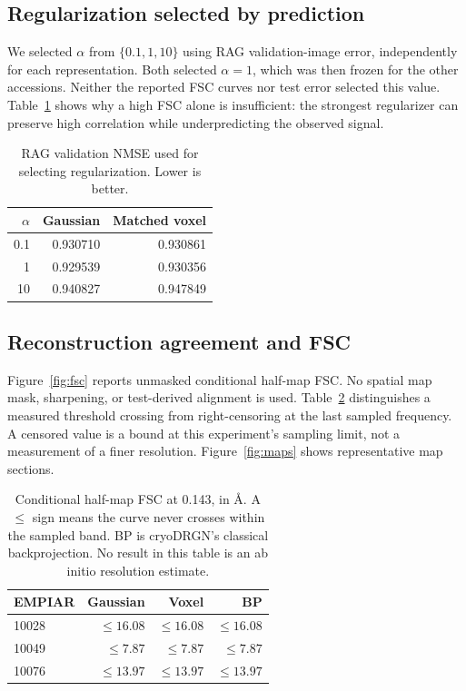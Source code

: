 \subsection{Regularization selected by prediction}
We selected $\alpha$ from $\{0.1,1,10\}$ using RAG validation-image error,
independently for each representation. Both selected $\alpha=1$, which was then
frozen for the other accessions. Neither the reported FSC curves nor test error
selected this value. Table~\ref{tab:reg} shows why a high FSC alone is insufficient:
the strongest regularizer can preserve high correlation while underpredicting
the observed signal.
\begin{table}[t]
\caption{RAG validation NMSE used for selecting regularization. Lower is better.}
\label{tab:reg}\centering\small
\begin{tabular}{rrr}\toprule
$\alpha$ & Gaussian & Matched voxel\\\midrule
0.1 & 0.930710 & 0.930861 \\
1 & 0.929539 & 0.930356 \\
10 & 0.940827 & 0.947849 \\
\bottomrule\end{tabular}\end{table}

\subsection{Reconstruction agreement and FSC}
Figure~\ref{fig:fsc} reports unmasked conditional half-map FSC. No spatial map
mask, sharpening, or test-derived alignment is used. Table~\ref{tab:fsc} distinguishes
a measured threshold crossing from right-censoring at the last sampled frequency.
A censored value is a bound at this experiment's sampling limit, not a measurement
of a finer resolution. Figure~\ref{fig:maps} shows representative map sections.



\begin{table}[t]
\caption{Conditional half-map FSC at 0.143, in \AA. A $\leq$ sign means the
curve never crosses within the sampled band. BP is cryoDRGN's classical
backprojection. No result in this table is an ab initio resolution estimate.}
\label{tab:fsc}\centering\small
\begin{tabular}{lrrr}\toprule
EMPIAR & Gaussian & Voxel & BP\\\midrule
10028 & $\leq 16.08$ & $\leq 16.08$ & $\leq 16.08$ \\
10049 & $\leq 7.87$ & $\leq 7.87$ & $\leq 7.87$ \\
10076 & $\leq 13.97$ & $\leq 13.97$ & $\leq 13.97$ \\
\bottomrule\end{tabular}\end{table}

